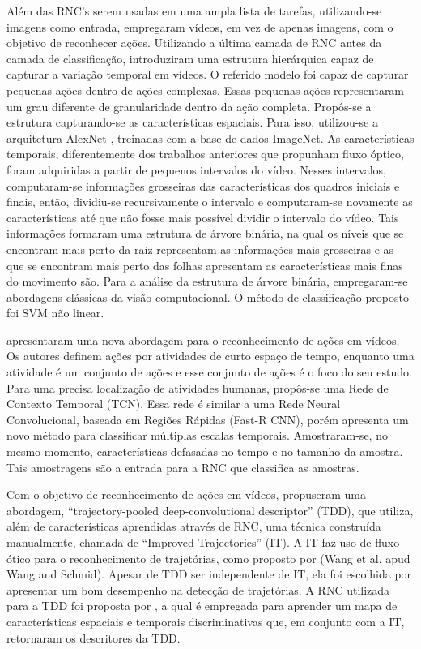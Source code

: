 \documentclass[
	12pt,				%
    oneside,			%
	a4paper,			%
	english,			%
	french,				%
	spanish,			%
	brazil,				%
	]{abntex2}
\begin{document}
Além das RNC’s serem usadas em uma ampla lista de tarefas, utilizando-se imagens como entrada,   empregaram vídeos, em vez de apenas imagens, com o objetivo de reconhecer ações. Utilizando a última camada de RNC antes da camada de classificação,  introduziram uma estrutura hierárquica capaz de capturar a variação temporal em vídeos. O referido modelo foi capaz de capturar pequenas ações dentro de ações complexas. Essas pequenas ações representaram um grau diferente de granularidade dentro da ação completa. Propôs-se a estrutura capturando-se as características espaciais. Para isso, utilizou-se a arquitetura AlexNet , treinadas com a base de dados ImageNet. As características temporais, diferentemente dos trabalhos anteriores que propunham fluxo óptico, foram adquiridas a partir de pequenos intervalos do vídeo. Nesses intervalos, computaram-se informações grosseiras das características dos quadros iniciais e finais, então, dividiu-se recursivamente o intervalo e computaram-se novamente as características até que não fosse mais possível dividir o intervalo do vídeo. Tais informações formaram uma estrutura de árvore binária, na qual os níveis que se encontram mais perto da raiz representam as informações mais grosseiras e as que se encontram mais perto das folhas apresentam as características mais finas do movimento são. Para a análise da estrutura de árvore binária, empregaram-se abordagens clássicas da visão computacional. O método de classificação proposto foi SVM não linear.

 apresentaram uma nova abordagem para o reconhecimento de ações em vídeos. Os autores definem ações por atividades de curto espaço de tempo, enquanto uma atividade é um conjunto de ações e esse conjunto de ações é o foco do seu estudo. Para uma precisa localização de atividades humanas, propôs-se uma Rede de Contexto Temporal (TCN). Essa rede é similar a uma Rede Neural Convolucional, baseada em Regiões Rápidas (Fast-R CNN), porém apresenta um novo método para classificar múltiplas escalas temporais. Amostraram-se, no mesmo momento, características defasadas no tempo e no tamanho da amostra. Tais amostragens são a entrada para a RNC que classifica as amostras.

Com o objetivo de reconhecimento de ações em vídeos,  propuseram uma abordagem, “trajectory-pooled deep-convolutional descriptor” (TDD), que utiliza, além de características aprendidas através de RNC, uma técnica construída manualmente, chamada de “Improved Trajectories” (IT). A IT faz uso de fluxo ótico para o reconhecimento de trajetórias, como proposto por (Wang et al. apud Wang and Schmid). Apesar de TDD ser independente de IT, ela foi escolhida por apresentar um bom desempenho na detecção de trajetórias. A RNC utilizada para a TDD foi proposta por , a qual é empregada para aprender um mapa de características espaciais e temporais discriminativas que, em conjunto com a IT, retornaram os descritores da TDD.
\end{document}
